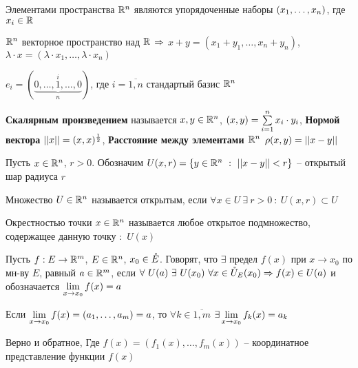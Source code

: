 \begin{defs}
	Элементами пространства $\mathbb{R}^n$ являются упорядоченные наборы $\left(x_1,\ldots,x_n\right)$, где $x_i \in \mathbb{R}$
\end{defs}

\begin{defs}
	$\mathbb{R}^n$ векторное пространство над $\mathbb{R}$ $\Rightarrow$ $x + y = (x_1+y_1, \ldots, x_{n}+y_{n})$, $\lambda \cdot x = (\lambda \cdot x_1, \ldots, \lambda \cdot x_n)$
\end{defs}

\begin{defs}
	$e_i = (\underbrace{0, \ldots, 1,\ldots,0}_n^i)$, где $i = \overline{1,n}$ стандартый базис $\mathbb{R}^n$
\end{defs}

\begin{defs}
	\textbf{Скалярным произведением} называется $x,y \in \mathbb{R}^n$, $\left( x,y\right) = \sum\limits_{i=1}^{n}x_i \cdot y_i$, \textbf{Нормой вектора} $\left|\left| x\right|\right| = (x,x)^{\frac{1}{2}}$, \textbf{Расстояние между элементами $\mathbb{R}^n$} $\rho(x,y)= \left|\left| x-y\right|\right|$
\end{defs}

\begin{defs}
	Пусть $x \in \mathbb{R}^n$, $r > 0$. Обозначим $U(x,r) = \fskobk{y \in \Rmern{n} \ : \ \DModul{x-y} < r}$ -- открытый шар радиуса $r$
\end{defs}

\begin{defs}
	Множество $U \in \mathbb{R}^n$ называется открытым, если $\forall x \in U \ \exists \ r > 0 \ : \  U(x,r) \subset U$
\end{defs}

\begin{defs}
	Окрестностью точки $x \in \mathbb{R}^n$ называется любое открытое подмножество, содержащее данную точку $:$ $U(x)$
\end{defs}

\begin{defs}
	Пусть $f: E \to \mathbb{R}^m$, $E \in \mathbb{R}^n$, $x_0 \in \mathring{E}$. Говорят, что $\exists$ предел $f(x)$ при $x\to x_0$ по мн-ву $E$, равный $a \in \mathbb{R}^m$, если $\forall \ U(a) \ \exists \ U(x_0) \ \forall x \in \mathring{U}_{E}(x_0) \Rightarrow f(x) \in U(a)$
	и обозначается $\lim\limits_{x \to x_0}f(x)= a$
\end{defs}

\begin{claim}[]
	Если $\lim\limits_{x\to x_0}f(x)=(a_1,\ldots,a_m)=a$, то $\forall k \in \overline{1,m} $ $\exists \lim\limits_{x \to x_0}f_k(x)=a_k$

	Верно и обратное, Где $f(x)=(f_1(x),\ldots,f_m(x))$ -- координатное представление функции $f(x)$

\end{claim}

